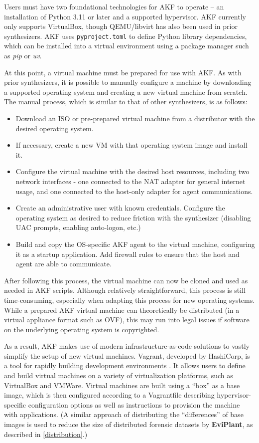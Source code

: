 Users must have two foundational technologies for AKF to operate -- an
installation of Python 3.11 or later and a supported hypervisor. AKF
currently only supports VirtualBox, though QEMU/libvirt has also been
used in prior synthesizers. AKF uses
\passthrough{\lstinline!pyproject.toml!} to define Python library
dependencies, which can be installed into a virtual environment using a
package manager such as \emph{pip} or \emph{uv}.

At this point, a virtual machine must be prepared for use with AKF. As
with prior synthesizers, it is possible to manually configure a machine
by downloading a supported operating system and creating a new virtual
machine from scratch. The manual process, which is similar to that of
other synthesizers, is as follows:

\begin{itemize}
\tightlist
\item
  Download an ISO or pre-prepared virtual machine from a distributor
  with the desired operating system.
\item
  If necessary, create a new VM with that operating system image and
  install it.
\item
  Configure the virtual machine with the desired host resources,
  including two network interfaces - one connected to the NAT adapter
  for general internet usage, and one connected to the host-only adapter
  for agent communications.
\item
  Create an administrative user with known credentials. Configure the
  operating system as desired to reduce friction with the synthesizer
  (disabling UAC prompts, enabling auto-logon, etc.)
\item
  Build and copy the OS-specific AKF agent to the virtual machine,
  configuring it as a startup application. Add firewall rules to ensure
  that the host and agent are able to communicate.
\end{itemize}

After following this process, the virtual machine can now be cloned and
used as needed in AKF scripts. Although relatively straightforward, this
process is still time-consuming, especially when adapting this process
for new operating systems. While a prepared AKF virtual machine can
theoretically be distributed (in a virtual appliance format such as
OVF), this may run into legal issues if software on the underlying
operating system is copyrighted.

As a result, AKF makes use of modern infrastructure-as-code solutions to
vastly simplify the setup of new virtual machines. Vagrant, developed by
HashiCorp, is a tool for rapidly building development environments
\cite{HashicorpVagrant2025}. It allows users to define and build
virtual machines on a variety of virtualization platforms, such as
VirtualBox and VMWare. Virtual machines are built using a ``box'' as a
base image, which is then configured according to a Vagrantfile
describing hypervisor-specific configuration options as well as
instructions to provision the machine with applications. (A similar
approach of distributing the ``differences'' of base images is used to
reduce the size of distributed forensic datasets by \textbf{EviPlant},
as described in \autoref{distribution}.)

